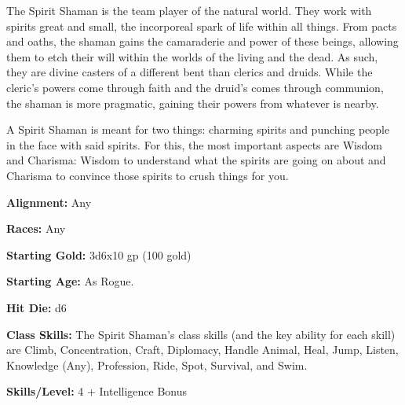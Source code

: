 
The Spirit Shaman is the team player of the natural world. They work with spirits great and small, the incorporeal spark of life within all things. From pacts and oaths, the shaman gains the camaraderie and power of these beings, allowing them to etch their will within the worlds of the living and the dead. As such, they are divine casters of a different bent than clerics and druids. While the cleric's powers come through faith and the druid's comes through communion, the shaman is more pragmatic, gaining their powers from whatever is nearby.

A Spirit Shaman is meant for two things: charming spirits and punching people in the face with said spirits. For this, the most important aspects are Wisdom and Charisma: Wisdom to understand what the spirits are going on about and Charisma to convince those spirits to crush things for you.

\textbf{Alignment:} Any

\textbf{Races:} Any

\textbf{Starting Gold:} 3d6x10 gp (100 gold)

\textbf{Starting Age:} As Rogue.

\textbf{Hit Die:} d6

\textbf{Class Skills:} The Spirit Shaman's class skills (and the key ability for each skill) are Climb, Concentration, Craft, Diplomacy, Handle Animal, Heal, Jump, Listen, Knowledge (Any), Profession, Ride, Spot, Survival, and Swim.

\textbf{Skills/Level:} 4 + Intelligence Bonus

\poorbab{}
\poorfor{}
\goodref{}
\goodwil{}


